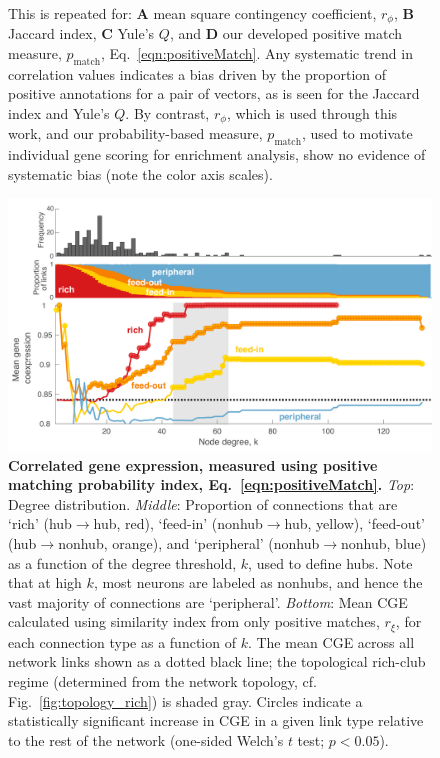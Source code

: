 \documentclass[10pt,letterpaper]{article}
\begin{document}
{\begin{figure}[h]
{This is repeated for:
\textbf{A} mean square contingency coefficient, $r_\phi$,
\textbf{B} Jaccard index,
\textbf{C} Yule's $Q$, and
\textbf{D} our developed positive match measure, $p_\mathrm{match}$, Eq.~\eqref{eqn:positiveMatch}.
Any systematic trend in correlation values indicates a bias driven by the proportion of positive annotations for a pair of vectors, as is seen for the Jaccard index and Yule's $Q$.
By contrast, $r_\phi$, which is used through this work, and our probability-based measure, $p_\mathrm{match}$, used to motivate individual gene scoring for enrichment analysis, show no evidence of systematic bias (note the color axis scales).
}
\end{figure}


\begin{figure}[!h]
\centering
    \includegraphics[width=1\textwidth]{meanCoexpressionCoXALL.pdf}
\caption{
\textbf{Correlated gene expression, measured using positive matching probability index, Eq.~\eqref{eqn:positiveMatch}.}
\emph{Top}: Degree distribution.
\emph{Middle}: Proportion of connections that are `rich' (hub$\rightarrow$hub, red), `feed-in' (nonhub$\rightarrow$hub, yellow), `feed-out' (hub$\rightarrow$nonhub, orange), and `peripheral' (nonhub$\rightarrow$nonhub, blue) as a function of the degree threshold, $k$, used to define hubs.
Note that at high $k$, most neurons are labeled as nonhubs, and hence the vast majority of connections are `peripheral'.
\emph{Bottom}: Mean CGE calculated using similarity index from only positive matches, $r_\xi$, for each connection type as a function of $k$.
The mean CGE across all network links shown as a dotted black line; the topological rich-club regime (determined from the network topology, cf. Fig.~\ref{fig:topology_rich}) is shaded gray.
Circles indicate a statistically significant increase in CGE in a given link type relative to the rest of the network (one-sided Welch's $t$ test; $p < 0.05$).
\label{fig:RFPposmatches}
}
\end{figure}

}
\end{document}
